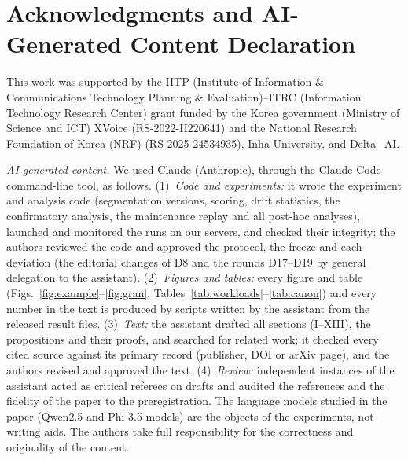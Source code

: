 \documentclass[conference]{IEEEtran}
\begin{document}
\section*{Acknowledgments and AI-Generated Content Declaration}
This work was supported by the IITP (Institute of Information \& Communications Technology Planning \& Evaluation)--ITRC
(Information Technology Research Center) grant funded by the Korea government (Ministry of Science and ICT) XVoice
(RS-2022-II220641) and the National Research Foundation of Korea (NRF) (RS-2025-24534935), Inha University, and
Delta\_AI.

\textit{AI-generated content.} We used Claude (Anthropic), through the Claude Code command-line tool, as follows.
(1)~\emph{Code and experiments:} it wrote the experiment and analysis code (segmentation versions, scoring, drift
statistics, the confirmatory analysis, the maintenance replay and all post-hoc analyses), launched and monitored the
runs on our servers, and checked their integrity; the authors reviewed the code and approved the protocol, the
freeze and each deviation (the editorial changes of D8 and the rounds D17--D19 by general delegation to the assistant). (2)~\emph{Figures and tables:} every figure and table (Figs.~\ref{fig:example}--\ref{fig:gran},
Tables~\ref{tab:workloads}--\ref{tab:canon}) and every number in the text is produced by scripts written by the
assistant from the released result files. (3)~\emph{Text:} the assistant drafted all sections (I--XIII), the
propositions and their proofs, and searched for related work; it checked every cited source against its primary record (publisher, DOI or arXiv
page), and the authors revised and approved the text. (4)~\emph{Review:} independent instances of the assistant acted
as critical referees on drafts and audited the references and the fidelity of the paper to the preregistration. The language models studied in the paper (Qwen2.5 and Phi-3.5 models) are the objects of the
experiments, not writing aids. The authors take full responsibility for the correctness and originality of the
content.



\end{document}
